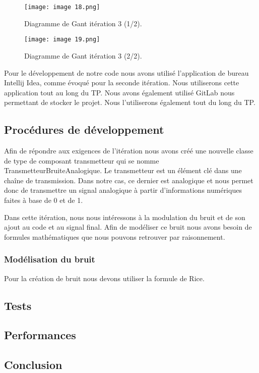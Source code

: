 \begin{figure}[H]
    \centering
    \texttt{[image: image 18.png]}
    \caption{\label{fig:image18}Diagramme de Gant itération 3 (1/2).}
\end{figure}
\begin{figure}[H]
    \centering
    \texttt{[image: image 19.png]}
    \caption{\label{fig:image19}Diagramme de Gant itération 3 (2/2).}
\end{figure}

Pour le développement de notre code nous avons utilisé l'application de bureau Intellij Idea, comme évoqué pour la seconde itération. Nous utiliserons cette application tout au long du TP. Nous avons également utilisé GitLab nous permettant de stocker le projet. Nous l'utiliserons également tout du long du TP.

\subsection{Procédures de développement}

Afin de répondre aux exigences de l'itération nous avons créé une nouvelle classe de type de composant transmetteur qui se nomme TransmetteurBruiteAnalogique. Le transmetteur est un élément clé dans une chaîne de transmission. Dans notre cas, ce dernier est analogique et nous permet donc de transmettre un signal analogique à partir d'informations numériques faites à base de 0 et de 1.

Dans cette itération, nous nous intéressons à la modulation du bruit et de son ajout au code et au signal final. Afin de modéliser ce bruit nous avons besoin de formules mathématiques que nous pouvons retrouver par raisonnement.

\subsubsection{Modélisation du bruit}
Pour la création de bruit nous devons utiliser la formule de Rice.

\subsection{Tests}

\subsection{Performances}

\subsection{Conclusion}